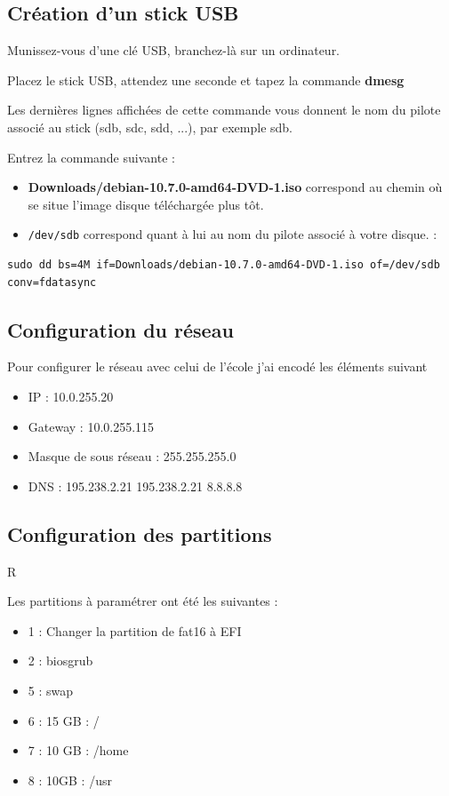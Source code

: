 \documentclass[12pt,a4paper]{article}
\newcommand{\code}[1]{\colorbox{light-gray}{\texttt{#1}}}
\begin{document}
\begin{flushleft}
       \subsection{Création d'un stick USB}
       \item Munissez-vous d'une clé USB, branchez-là sur un ordinateur.
       \item Placez le stick USB, attendez une seconde et tapez la commande \textbf{dmesg}
       \item Les dernières lignes affichées de cette commande vous donnent le nom du pilote associé au stick (sdb,
sdc, sdd, ...), par exemple sdb.
        \item Entrez la commande suivante : 
        \begin{itemize}
            \item \textbf{Downloads/debian-10.7.0-amd64-DVD-1.iso} correspond au chemin où se situe l'image disque téléchargée plus tôt. 
            \item \code{/dev/sdb} correspond quant à lui au nom du pilote associé à votre disque. : 
        \end{itemize}
        \begin{lstlisting}
sudo dd bs=4M if=Downloads/debian-10.7.0-amd64-DVD-1.iso of=/dev/sdb conv=fdatasync
        \end{lstlisting}
        

       \subsection{Configuration du réseau}
       \item Pour configurer le réseau avec celui de l'école j'ai encodé les éléments suivant
       \begin{itemize}
           \item IP : 10.0.255.20
           \item Gateway : 10.0.255.115
           \item Masque de sous réseau : 255.255.255.0
           \item DNS : 195.238.2.21 195.238.2.21 8.8.8.8
       \end{itemize}
       \subsection{Configuration des partitions}R
       \item Les partitions à paramétrer ont été les suivantes : 
       \begin{itemize}
           \item 1 : Changer la partition de fat16 à EFI
           \item 2 : biosgrub
           \item 5 : swap
           \item 6 : 15 GB : / 
           \item 7 : 10 GB : /home
           \item 8 : 10GB : /usr 
       \end{itemize}

\end{flushleft}
\end{document}
